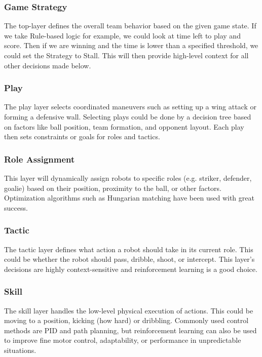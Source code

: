 \subsubsection{Game Strategy}
The top-layer defines the overall team behavior based on the given game state.
If we take Rule-based logic for example, we could look at time left to play and score.
Then if we are winning and the time is lower than a specified threshold, we could set the Strategy to Stall. This will then provide high-level context for all other decisions made below.

\subsubsection{Play}
The play layer selects coordinated maneuvers such as setting up a wing attack or forming a defensive wall. Selecting plays could be done by a decision tree based on factors like ball position, team formation, and opponent layout. Each play then sets constraints or goals for roles and tactics.

\subsubsection{Role Assignment}
This layer will dynamically assign robots to specific roles (e.g. striker, defender, goalie) based on their position, proximity to the ball, or other factors.
Optimization algorithms such as Hungarian matching have been used with great success.

\subsubsection{Tactic}
The tactic layer defines what action a robot should take in its current role.
This could be whether the robot should pass, dribble, shoot, or intercept.
This layer's decisions are highly context-sensitive and reinforcement learning is a good choice.

\subsubsection{Skill}
The skill layer handles the low-level physical execution of actions.
This could be moving to a position, kicking (how hard) or dribbling. Commonly used control methods are PID and path planning, but reinforcement learning can also be used to improve fine motor control, adaptability, or performance in unpredictable situations.

